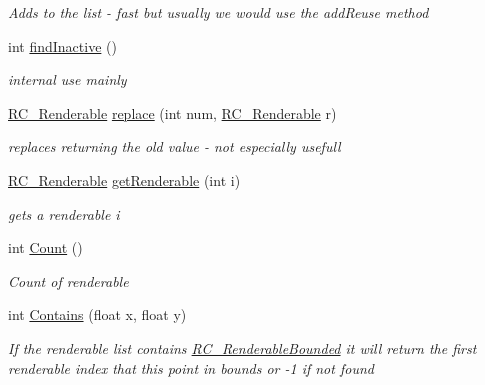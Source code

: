 \begin{DoxyCompactItemize}
\begin{DoxyCompactList}\small\item\em Adds to the list -\/ fast but usually we would use the \textquotesingle{}add\+Reuse\textquotesingle{} method \end{DoxyCompactList}\item 
int \mbox{\hyperlink{class_r_c___framework_1_1_r_c___renderable_list_aefabaf7b1a4e5e163d4a6e77cc07b94a}{find\+Inactive}} ()
\begin{DoxyCompactList}\small\item\em internal use mainly \end{DoxyCompactList}\item 
\mbox{\hyperlink{class_r_c___framework_1_1_r_c___renderable}{R\+C\+\_\+\+Renderable}} \mbox{\hyperlink{class_r_c___framework_1_1_r_c___renderable_list_abb4dfff8d5e8ac2e96034e591c96d811}{replace}} (int num, \mbox{\hyperlink{class_r_c___framework_1_1_r_c___renderable}{R\+C\+\_\+\+Renderable}} r)
\begin{DoxyCompactList}\small\item\em replaces returning the old value -\/ not especially usefull \end{DoxyCompactList}\item 
\mbox{\hyperlink{class_r_c___framework_1_1_r_c___renderable}{R\+C\+\_\+\+Renderable}} \mbox{\hyperlink{class_r_c___framework_1_1_r_c___renderable_list_a75b4ae92f064d35358185fe12bda892c}{get\+Renderable}} (int i)
\begin{DoxyCompactList}\small\item\em gets a renderable i \end{DoxyCompactList}\item 
int \mbox{\hyperlink{class_r_c___framework_1_1_r_c___renderable_list_a89f525ac211787c14d1b16f925bc4558}{Count}} ()
\begin{DoxyCompactList}\small\item\em Count of renderable \end{DoxyCompactList}\item 
int \mbox{\hyperlink{class_r_c___framework_1_1_r_c___renderable_list_afab33aa056d75a88414f62576aa0cbd9}{Contains}} (float x, float y)
\begin{DoxyCompactList}\small\item\em If the renderable list contains \mbox{\hyperlink{class_r_c___framework_1_1_r_c___renderable_bounded}{R\+C\+\_\+\+Renderable\+Bounded}} it will return the first renderable index that this point in bounds or -\/1 if not found \end{DoxyCompactList}\item 

\end{DoxyCompactItemize}
